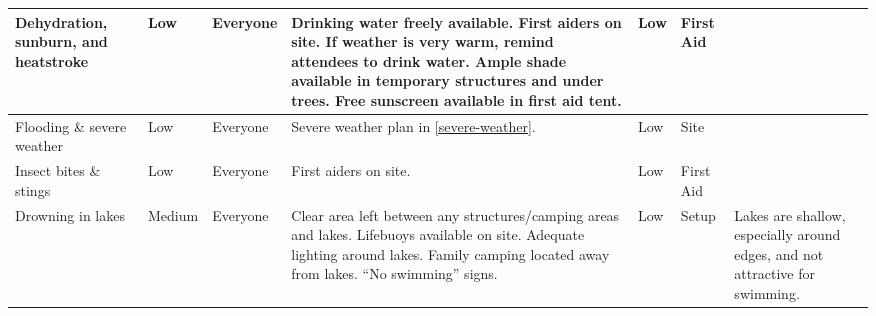 \begin{landscape}
\begin{table}[h!]
\begin{tabular}{| p{3cm} | l | p{1.5cm} | p{9cm} | p{1.5cm} | p{2cm} | p{5cm} |}
            Dehydration, sunburn, and heatstroke                                                                   & Low                       & Everyone                                                              &
            Drinking water freely available.
            First aiders on site.
            If weather is very warm, remind attendees to drink water.
            Ample shade available in temporary structures and under trees.
            Free sunscreen available in first aid tent.
                                                                                                                   & Low                       & First Aid                                                             &                                                                               \\ \hline

            Flooding \& severe weather                                                                             & Low                       & Everyone                                                              &
            Severe weather plan in \cref{severe-weather}.                                                          & Low                       & Site                                                                  &                                                                               \\ \hline

            Insect bites \& stings                                                                                 & Low                       & Everyone                                                              &
            First aiders on site.                                                                                  & Low                       & First Aid                                                             &                                                                               \\ \hline

            Drowning in lakes                                                                                      & Medium                    & Everyone                                                              &
            Clear area left between any structures/camping areas and lakes.
            Lifebuoys available on site. Adequate lighting around lakes.
            Family camping located away from lakes. ``No swimming'' signs.
                                                                                                                   & Low                       & Setup                                                                 &
            Lakes are shallow, especially around edges, and not attractive for
            swimming.
            \\ \hline
        \end{tabular}
    \end{table}
    \newpage
    \thispagestyle{empty}

\end{landscape}
